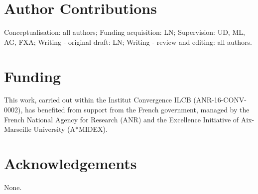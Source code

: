 \documentclass[utf8]{template/frontiersSCNS} %
\begin{document}
\section*{Author Contributions}




Conceptualisation: all authors; Funding acquisition: LN; Supervision: UD, ML, AG, FXA; Writing - original draft: LN; Writing - review and editing: all authors.

\section*{Funding}


This work, carried out within the Institut Convergence ILCB (ANR-16-CONV-0002), has benefited from support from the French government, managed by the French National Agency for Research (ANR) and the Excellence Initiative of Aix-Marseille University (A*MIDEX).

\section*{Acknowledgements}

None.


\end{document}
